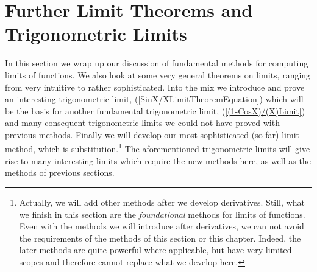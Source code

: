 \newpage


\section{Further Limit Theorems and Trigonometric Limits
\label{MoreLimitTheoremsSection}}
In this section we wrap up our discussion of fundamental
methods for computing limits of functions.
We also look at some very general theorems on limits,
ranging from very intuitive to rather sophisticated. 
Into the mix we introduce and prove an interesting
trigonometric limit, (\ref{SinX/XLimitTheoremEquation})
which will be the basis for another
fundamental trigonometric limit,
(\ref{(1-CosX)/(X)Limit}) and many consequent
trigonometric limits we could not have proved with
previous methods.
Finally we will develop our most sophisticated (so far)
limit method, which is substitution.\footnote{%
Actually, we will add other methods after we develop
derivatives.  Still, what we finish in this section
are the {\it foundational} methods for limits of functions.
Even with the methods we will introduce after derivatives,
we can not avoid the requirements of the methods of
this section or this chapter.  Indeed, the later methods
are quite powerful where applicable, but
have very limited scopes and  therefore cannot replace
what we develop here.
}  The aforementioned trigonometric limits
will give rise to many interesting limits which require
the new methods here, as well as the methods of previous sections.




